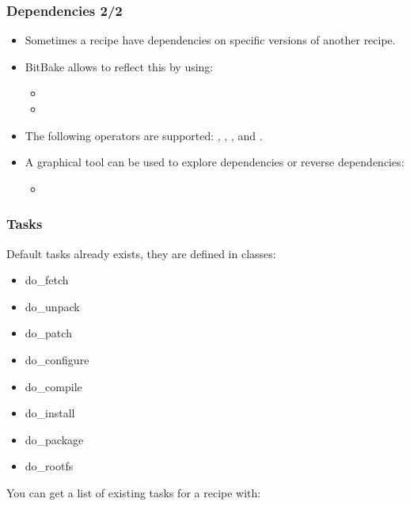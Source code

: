 \begin{frame}
  \frametitle{Dependencies 2/2}
  \begin{itemize}
    \item Sometimes a recipe have dependencies on specific versions
      of another recipe.
    \item BitBake allows to reflect this by using:
    \begin{itemize}
      \item {}
      \item {}
    \end{itemize}
    \item The following operators are supported: \code{=}, \code{>},
      \code{<}, \code{>=} and \code{<=}.
    \item A graphical tool can be used to explore dependencies or
      reverse dependencies:
    \begin{itemize}
      \item {}
    \end{itemize}
  \end{itemize}
\end{frame}

\begin{frame}[fragile]
  \frametitle{Tasks}
  Default tasks already exists, they are defined in classes:
  \begin{itemize}
    \item do\_fetch
    \item do\_unpack
    \item do\_patch
    \item do\_configure
    \item do\_compile
    \item do\_install
    \item do\_package
    \item do\_rootfs
  \end{itemize}
  You can get a list of existing tasks for a recipe with:
\end{frame}

